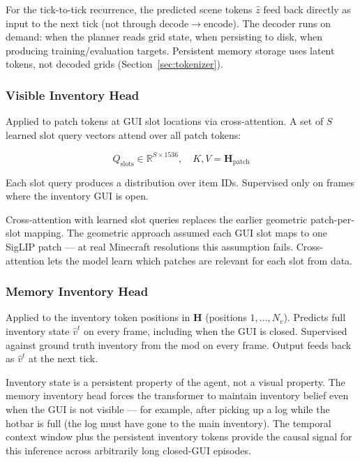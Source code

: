 \documentclass[11pt,a4paper]{article}
\begin{document}
For the tick-to-tick recurrence, the predicted scene tokens $\hat{z}$ feed back directly as input to the next tick (not through decode$\to$encode). The decoder runs on demand: when the planner reads grid state, when persisting to disk, when producing training/evaluation targets. Persistent memory storage uses latent tokens, not decoded grids (Section~\ref{sec:tokenizer}).

\subsubsection{Visible Inventory Head}

Applied to patch tokens at GUI slot locations via cross-attention. A set of $S$ learned slot query vectors attend over all patch tokens:

\[
Q_\text{slots} \in \mathbb{R}^{S \times 1536},\quad K,V = \mathbf{H}_\text{patch}
\]

Each slot query produces a distribution over item IDs. Supervised only on frames where the inventory GUI is open.

\begin{designdecision}
Cross-attention with learned slot queries replaces the earlier geometric patch-per-slot mapping. The geometric approach assumed each GUI slot maps to one SigLIP patch --- at real Minecraft resolutions this assumption fails. Cross-attention lets the model learn which patches are relevant for each slot from data.
\end{designdecision}

\subsubsection{Memory Inventory Head}

Applied to the inventory token positions in $\mathbf{H}$ (positions $1, \ldots, N_v$). Predicts full inventory state $\hat{v}^t$ on every frame, including when the GUI is closed. Supervised against ground truth inventory from the mod on every frame. Output feeds back as $\hat{v}^t$ at the next tick.

\begin{designdecision}
Inventory state is a persistent property of the agent, not a visual property. The memory inventory head forces the transformer to maintain inventory belief even when the GUI is not visible --- for example, after picking up a log while the hotbar is full (the log must have gone to the main inventory). The temporal context window plus the persistent inventory tokens provide the causal signal for this inference across arbitrarily long closed-GUI episodes.
\end{designdecision}
\end{document}
